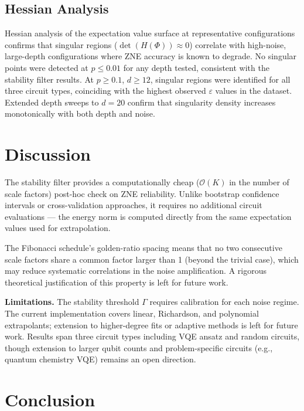 \documentclass[twocolumn,showpacs,preprintnumbers,amsmath,amssymb,prl]{revtex4-2}
\begin{document}
\subsection{Hessian Analysis}

Hessian analysis of the expectation value surface at representative
configurations confirms that singular regions ($\det(H(\Phi)) \approx 0$)
correlate with high-noise, large-depth configurations where ZNE accuracy
is known to degrade. No singular points were detected at $p \leq 0.01$
for any depth tested, consistent with the stability filter results.
At $p \geq 0.1$, $d \geq 12$, singular regions were identified for all
three circuit types, coinciding with the highest observed $\varepsilon$
values in the dataset. Extended depth sweeps to $d=20$ confirm that
singularity density increases monotonically with both depth and noise.

\section{Discussion}
\label{sec:discussion}

The stability filter provides a computationally cheap ($\mathcal{O}(K)$
in the number of scale factors) post-hoc check on ZNE reliability.
Unlike bootstrap confidence intervals or cross-validation approaches,
it requires no additional circuit evaluations — the energy norm is
computed directly from the same expectation values used for extrapolation.

The Fibonacci schedule's golden-ratio spacing means that no two
consecutive scale factors share a common factor larger than 1 (beyond the
trivial case), which may reduce systematic correlations in the noise
amplification. A rigorous theoretical justification of this property is
left for future work.

\textbf{Limitations.} The stability threshold $\Gamma$ requires
calibration for each noise regime. The current implementation covers
linear, Richardson, and polynomial extrapolants; extension to
higher-degree fits or adaptive methods is left for future work.
Results span three circuit types including VQE ansatz and random
circuits, though extension to larger qubit counts and problem-specific
circuits (e.g., quantum chemistry VQE) remains an open direction.

\section{Conclusion}
\label{sec:conclusion}
\end{document}
